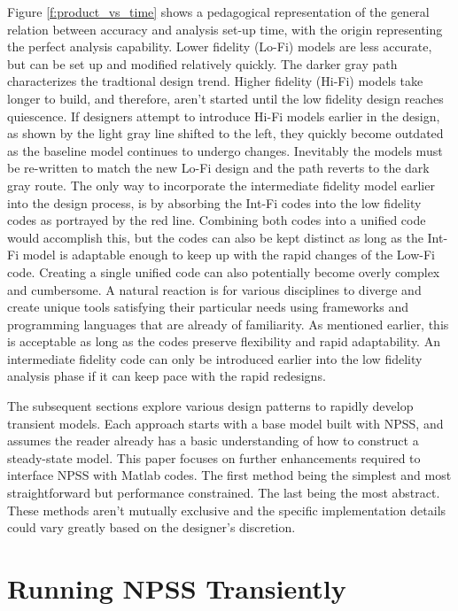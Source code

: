 \documentclass[heading.tex]{subfiles}
\begin{document}
Figure \ref{f:product_vs_time} shows a pedagogical representation of the general relation between
accuracy and analysis set-up time, with the origin representing the perfect analysis capability.
Lower fidelity (Lo-Fi) models are less accurate, but can be set
up and modified relatively quickly. The darker gray path characterizes the tradtional design
trend. Higher fidelity (Hi-Fi) models take longer to build, and therefore, aren't started until
the low fidelity design reaches quiescence. If designers attempt to introduce Hi-Fi models earlier in
the design, as shown by the light gray line shifted to the left, they quickly become outdated as
the baseline model continues to undergo changes. Inevitably the models must be re-written to match
the new Lo-Fi design and the path reverts to the dark gray route. The only way to incorporate the
intermediate fidelity model earlier into the design process, is by absorbing the Int-Fi codes into
the low fidelity codes as portrayed by the red line. Combining both codes into a unified code
would accomplish this, but the codes can also be kept distinct as long as the Int-Fi model is
adaptable enough to keep up with the rapid changes of the Low-Fi code. Creating a single unified
code can also potentially become overly complex and cumbersome. A natural reaction is for various
disciplines to diverge and create unique tools satisfying their particular needs using frameworks
and programming languages that are already of familiarity. As mentioned earlier, this is
acceptable as long as the codes preserve flexibility and rapid adaptability. An intermediate
fidelity code can only be introduced earlier into the low fidelity analysis phase if it can keep
pace with the rapid redesigns.

The subsequent sections explore various design patterns to rapidly develop transient models. Each
approach starts with a base model built with NPSS, and assumes the reader already has a basic
understanding of how to construct a steady-state model. This paper focuses on further enhancements
required to interface NPSS with Matlab codes. The first method being the simplest and most
straightforward but performance constrained. The last being the most abstract. These methods
aren't mutually exclusive and the specific implementation details could vary greatly based on the
designer's discretion. 


\section{Running NPSS Transiently}
\end{document}
